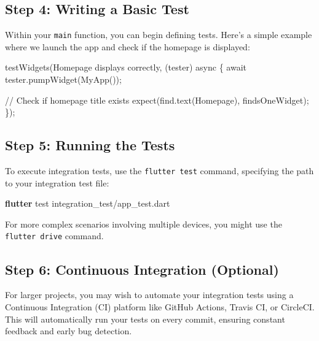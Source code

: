 \documentclass[
]{article}
\newenvironment{Shaded}{\begin{snugshade}}{\end{snugshade}}
\newcommand{\AttributeTok}[1]{\textcolor[rgb]{0.16,0.50,0.73}{#1}}
\newcommand{\CommentTok}[1]{\textcolor[rgb]{0.48,0.49,0.49}{#1}}
\newcommand{\ExtensionTok}[1]{\textcolor[rgb]{0.00,0.60,1.00}{\textbf{#1}}}
\newcommand{\NormalTok}[1]{\textcolor[rgb]{0.81,0.81,0.76}{#1}}
\newcommand{\OperatorTok}[1]{\textcolor[rgb]{0.81,0.81,0.76}{#1}}
\newcommand{\StringTok}[1]{\textcolor[rgb]{0.96,0.31,0.31}{#1}}
\begin{document}
\subsection{Step 4: Writing a Basic
Test}\label{step-4-writing-a-basic-test}

Within your \texttt{main} function, you can begin defining tests. Here's
a simple example where we launch the app and check if the homepage is
displayed:

\begin{Shaded}
\begin{Highlighting}[]
\NormalTok{testWidgets(}\StringTok{\textquotesingle{}Homepage displays correctly\textquotesingle{}}\OperatorTok{,}\NormalTok{ (tester) }\AttributeTok{async} \OperatorTok{\{}
  \AttributeTok{await}\NormalTok{ tester}\OperatorTok{.}\NormalTok{pumpWidget(MyApp());}

  \CommentTok{// Check if homepage title exists}
\NormalTok{  expect(find}\OperatorTok{.}\NormalTok{text(}\StringTok{\textquotesingle{}Homepage\textquotesingle{}}\NormalTok{)}\OperatorTok{,}\NormalTok{ findsOneWidget);}
\OperatorTok{\}}\NormalTok{);}
\end{Highlighting}
\end{Shaded}

\subsection{Step 5: Running the Tests}\label{step-5-running-the-tests}

To execute integration tests, use the \texttt{flutter\ test} command,
specifying the path to your integration test file:

\begin{Shaded}
\begin{Highlighting}[]
\ExtensionTok{flutter}\NormalTok{ test integration\_test/app\_test.dart}
\end{Highlighting}
\end{Shaded}

For more complex scenarios involving multiple devices, you might use the
\texttt{flutter\ drive} command.

\subsection{Step 6: Continuous Integration
(Optional)}\label{step-6-continuous-integration-optional}

For larger projects, you may wish to automate your integration tests
using a Continuous Integration (CI) platform like GitHub Actions, Travis
CI, or CircleCI. This will automatically run your tests on every commit,
ensuring constant feedback and early bug detection.
\end{document}
